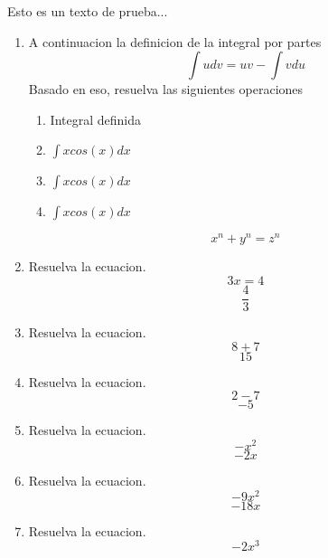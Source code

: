 \documentclass[12pt]{article}%
\begin{document}
%
\normalsize%
\pagestyle{header}%
Esto es un texto de prueba...%
\begin{enumerate}[wide, labelwidth=!, labelindent=0pt,label={Pregunta \arabic*. }]%
\item%
%
A continuacion la definicion de la integral por partes%
\[\int udv=uv-\int vdu\]%
Basado en eso, resuelva las siguientes operaciones%
\begin{enumerate}[wide, labelwidth=!, labelindent=0pt,label={\Alph*) }]%
\item%
%
Integral definida\\%
\item%
%
\(\int xcos(x)dx\)%
\item%
%
\(\int xcos(x)dx\)%
\item%
%
\(\int xcos(x)dx\)%
\end{enumerate}%
\[ x^n + y^n = z^n \]%
\item%
%
Resuelva la ecuacion.%
\begin{equation*}3 x = 4\end{equation*}%
\begin{equation*}\frac{4}{3}\end{equation*}%
\item%
%
Resuelva la ecuacion.%
\begin{equation*}8 + 7\end{equation*}%
\begin{equation*}15\end{equation*}%
\item%
%
Resuelva la ecuacion.%
\begin{equation*}2 - 7\end{equation*}%
\begin{equation*}-5\end{equation*}%
\item%
%
Resuelva la ecuacion.%
\begin{equation*}- x^{2}\end{equation*}%
\begin{equation*}- 2 x\end{equation*}%
\item%
%
Resuelva la ecuacion.%
\begin{equation*}- 9 x^{2}\end{equation*}%
\begin{equation*}- 18 x\end{equation*}%
\item%
%
Resuelva la ecuacion.%
\begin{equation*}- 2 x^{3}\end{equation*}%

\end{enumerate}
\end{document}
